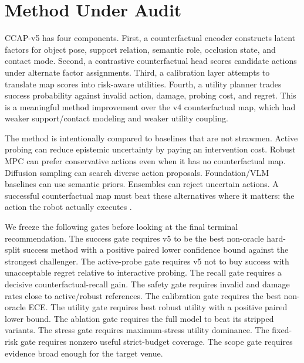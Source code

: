 \documentclass{article}
\newcommand{\method}{\textsc{CCAP-v5}}
\begin{document}
\section{Method Under Audit}
\method{} has four components. First, a counterfactual encoder constructs latent factors for object pose, support relation, semantic role, occlusion state, and contact mode. Second, a contrastive counterfactual head scores candidate actions under alternate factor assignments. Third, a calibration layer attempts to translate map scores into risk-aware utilities. Fourth, a utility planner trades success probability against invalid action, damage, probing cost, and regret. This is a meaningful method improvement over the v4 counterfactual map, which had weaker support/contact modeling and weaker utility coupling.

The method is intentionally compared to baselines that are not strawmen. Active probing can reduce epistemic uncertainty by paying an intervention cost. Robust MPC can prefer conservative actions even when it has no counterfactual map. Diffusion sampling can search diverse action proposals. Foundation/VLM baselines can use semantic priors. Ensembles can reject uncertain actions. A successful counterfactual map must beat these alternatives where it matters: the action the robot actually executes \citep{r101109robot1996503865,r101109icra20167487233,r101109icra20188461128,r1011771059712310370625,r220600432v1,r101109lra20253619820,r250811275v1,r250206519v1}.

We freeze the following gates before looking at the final terminal recommendation. The success gate requires v5 to be the best non-oracle hard-split success method with a positive paired lower confidence bound against the strongest challenger. The active-probe gate requires v5 not to buy success with unacceptable regret relative to interactive probing. The recall gate requires a decisive counterfactual-recall gain. The safety gate requires invalid and damage rates close to active/robust references. The calibration gate requires the best non-oracle ECE. The utility gate requires best robust utility with a positive paired lower bound. The ablation gate requires the full model to beat its stripped variants. The stress gate requires maximum-stress utility dominance. The fixed-risk gate requires nonzero useful strict-budget coverage. The scope gate requires evidence broad enough for the target venue.
\end{document}
